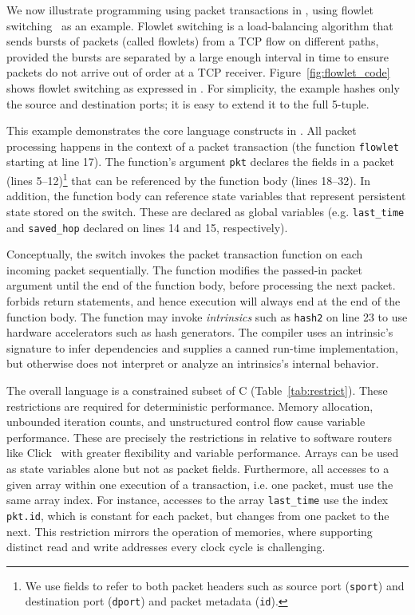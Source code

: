 We now illustrate programming using packet transactions in \pktlanguage, using
flowlet switching~\cite{flowlets} as an example. Flowlet switching is a
load-balancing algorithm that sends bursts of packets (called flowlets) from a
TCP flow on different paths, provided the bursts are separated by a large
enough interval in time to ensure packets do not arrive out of order at a TCP
receiver. Figure~\ref{fig:flowlet_code} shows flowlet switching as expressed in
\pktlanguage. For simplicity, the example hashes only the source and
destination ports; it is easy to extend it to the full 5-tuple.

This example demonstrates the core language constructs in \pktlanguage. All
packet processing happens in the context of a packet transaction (the function
\texttt{flowlet} starting at line 17). The function's argument {\tt pkt}
declares the fields in a packet (lines 5--12)\footnote{We use fields to refer
to both packet headers such as source port ({\tt sport}) and destination port
({\tt dport}) and packet metadata ({\tt id}).} that can be referenced by the
function body (lines 18--32).  In addition, the function body can reference
state variables that represent persistent state stored on the switch. These are
declared as global variables (e.g. \texttt{last\_time} and \texttt{saved\_hop}
declared on lines 14 and 15, respectively).

Conceptually, the switch invokes the packet transaction function on each
incoming packet sequentially. The function modifies the passed-in packet
argument until the end of the function body, before processing the next packet.
\pktlanguage forbids return statements, and hence execution will always end at
the end of the function body. The function may invoke \textit{intrinsics} such
as \texttt{hash2} on line 23 to use hardware accelerators such as hash generators.
The \pktlanguage compiler uses an intrinsic's
signature to infer dependencies and supplies a canned run-time implementation,
but otherwise does not interpret or analyze an intrinsics's internal behavior.

The overall language is
a constrained subset of C (Table~\ref{tab:restrict}).
These restrictions are required for deterministic performance.  Memory allocation, unbounded
iteration counts, and unstructured control flow cause variable performance.
These are precisely the restrictions in \pktlanguage relative to software
routers like Click~\cite{click} with greater flexibility and variable
performance. Arrays can be used as state
variables alone but not as packet fields.  Furthermore, all accesses to a given
array within one execution of a transaction, i.e. one packet, must use the same
array index. For instance, accesses to the array \texttt{last\_time} use
the index \texttt{pkt.id}, which is constant for each packet, but changes from
one packet to the next. This restriction mirrors the operation of memories,
where supporting distinct read and write addresses every clock cycle is challenging.


